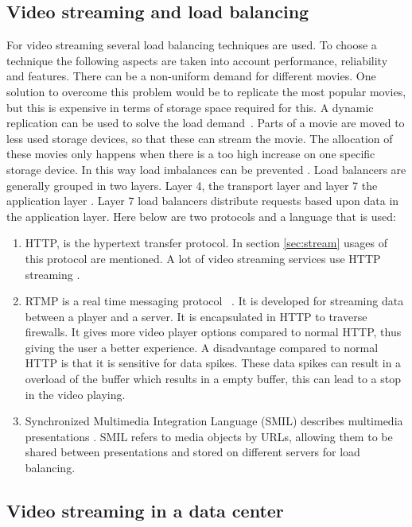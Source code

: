 \documentclass{sig-alternate-br}
\begin{document}
\subsection{Video streaming and load balancing}
For video streaming several load balancing techniques are used. To choose a technique the following aspects are taken into account performance, reliability and features. There can be a non-uniform demand for different movies. One solution to overcome this problem would be to replicate the most popular movies, but this is expensive in terms of storage space required for this. A dynamic replication can be used to solve the load demand~\cite{dan1996load}. Parts of a movie are moved to less used storage devices, so that these can stream the movie. The allocation of these movies only happens when there is a too high increase on one specific storage device. In this way load imbalances can be prevented \cite{dan1996load}. \newline
Load balancers are generally grouped in two layers. Layer 4, the transport layer and layer 7 the application layer \cite{computer-networking}. Layer 7 load balancers distribute requests based upon data in the application layer. Here below are two protocols and a language that is used:
\begin{enumerate}[topsep=0pt,itemsep=-1ex,partopsep=1ex,parsep=1ex]
	\item HTTP, is the hypertext transfer protocol. In section \ref{sec:stream} usages of this protocol are mentioned. A lot of video streaming services use HTTP streaming \cite{Adhikari:2012}.  
	\item RTMP is a real time messaging protocol ~\cite{rtmp}. It is developed for streaming data between a player and a server. It is encapsulated in HTTP to traverse firewalls. It gives more video player options compared to normal HTTP, thus giving the user a better experience. A disadvantage compared to normal HTTP is that it is sensitive for data spikes. These data spikes can result in a overload of the buffer which results in a empty buffer, this can lead to a stop in the video playing. 
	\item Synchronized Multimedia Integration Language (SMIL) describes multimedia presentations \cite{smil}. SMIL refers to media objects by URLs, allowing them to be shared between presentations and stored on different servers for load balancing. 
\end{enumerate}


\subsection{Video streaming in a data center}
\end{document}

